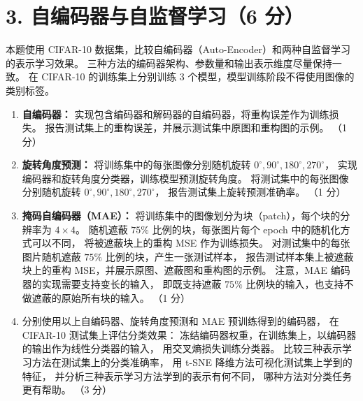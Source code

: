 \section*{3. 自编码器与自监督学习（6 分）}

本题使用 CIFAR-10 数据集，比较自编码器（Auto-Encoder）和两种自监督学习的表示学习效果。
三种方法的编码器架构、参数量和输出表示维度尽量保持一致。
在 CIFAR-10 的训练集上分别训练 3 个模型，模型训练阶段不得使用图像的类别标签。

\begin{enumerate}
    \item \textbf{自编码器：}
    实现包含编码器和解码器的自编码器，将重构误差作为训练损失。
    报告测试集上的重构误差，并展示测试集中原图和重构图的示例。
    （1 分）

    \item \textbf{旋转角度预测：}
    将训练集中的每张图像分别随机旋转 $0^\circ, 90^\circ, 180^\circ, 270^\circ$，
    实现编码器和旋转角度分类器，训练模型预测旋转角度。
    将测试集中的每张图像分别随机旋转 $0^\circ, 90^\circ, 180^\circ, 270^\circ$，
    报告测试集上旋转预测准确率。
    （1 分）

    \item \textbf{掩码自编码器（MAE）：}
    将训练集中的图像划分为块（patch），每个块的分辨率为 $4 \times 4$。
    随机遮蔽 $75\%$ 比例的块，每张图片每个 epoch 中的随机化方式可以不同，
    将被遮蔽块上的重构 MSE 作为训练损失。
    对测试集中的每张图片随机遮蔽 $75\%$ 比例的块，产生一张测试样本，
    报告测试样本集上被遮蔽块上的重构 MSE，并展示原图、遮蔽图和重构图的示例。
    注意，MAE 编码器的实现需要支持变长的输入，
    即既支持遮蔽 $75\%$ 比例块的输入，也支持不做遮蔽的原始所有块的输入。
    （1 分）

    \item 分别使用以上自编码器、旋转角度预测和 MAE 预训练得到的编码器，
    在 CIFAR-10 测试集上评估分类效果：
    冻结编码器权重，在训练集上，以编码器的输出作为线性分类器的输入，
    用交叉熵损失训练分类器。
    比较三种表示学习方法在测试集上的分类准确率，
    用 t-SNE 降维方法可视化测试集上学到的特征，
    并分析三种表示学习方法学到的表示有何不同，
    哪种方法对分类任务更有帮助。
    （3 分）
\end{enumerate}